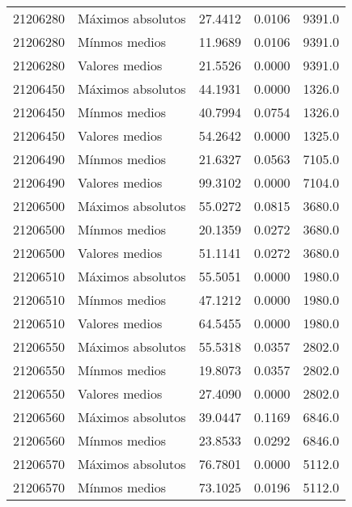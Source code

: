 \begin{longtable}{llrrr}
 21206280 &  Máximos absolutos &       27.4412 &         0.0106 &          9391.0 \\
 21206280 &      Mínmos medios &       11.9689 &         0.0106 &          9391.0 \\
 21206280 &     Valores medios &       21.5526 &         0.0000 &          9391.0 \\
 21206450 &  Máximos absolutos &       44.1931 &         0.0000 &          1326.0 \\
 21206450 &      Mínmos medios &       40.7994 &         0.0754 &          1326.0 \\
 21206450 &     Valores medios &       54.2642 &         0.0000 &          1325.0 \\
 21206490 &      Mínmos medios &       21.6327 &         0.0563 &          7105.0 \\
 21206490 &     Valores medios &       99.3102 &         0.0000 &          7104.0 \\
 21206500 &  Máximos absolutos &       55.0272 &         0.0815 &          3680.0 \\
 21206500 &      Mínmos medios &       20.1359 &         0.0272 &          3680.0 \\
 21206500 &     Valores medios &       51.1141 &         0.0272 &          3680.0 \\
 21206510 &  Máximos absolutos &       55.5051 &         0.0000 &          1980.0 \\
 21206510 &      Mínmos medios &       47.1212 &         0.0000 &          1980.0 \\
 21206510 &     Valores medios &       64.5455 &         0.0000 &          1980.0 \\
 21206550 &  Máximos absolutos &       55.5318 &         0.0357 &          2802.0 \\
 21206550 &      Mínmos medios &       19.8073 &         0.0357 &          2802.0 \\
 21206550 &     Valores medios &       27.4090 &         0.0000 &          2802.0 \\
 21206560 &  Máximos absolutos &       39.0447 &         0.1169 &          6846.0 \\
 21206560 &      Mínmos medios &       23.8533 &         0.0292 &          6846.0 \\
 21206570 &  Máximos absolutos &       76.7801 &         0.0000 &          5112.0 \\
 21206570 &      Mínmos medios &       73.1025 &         0.0196 &          5112.0 \\

\end{longtable}
